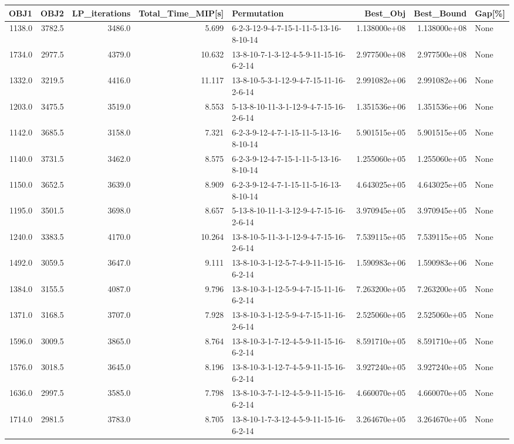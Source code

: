 \begin{tabular}{rrrrlrrl}
\toprule
   OBJ1 &    OBJ2 &  LP\_iterations &  Total\_Time\_MIP[s] &                             Permutation &      Best\_Obj &    Best\_Bound & Gap[\%] \\
\midrule
 1138.0 &  3782.5 &         3486.0 &              5.699 &  6-2-3-12-9-4-7-15-1-11-5-13-16-8-10-14 &  1.138000e+08 &  1.138000e+08 &   None \\
 1734.0 &  2977.5 &         4379.0 &             10.632 &  13-8-10-7-1-3-12-4-5-9-11-15-16-6-2-14 &  2.977500e+08 &  2.977500e+08 &   None \\
 1332.0 &  3219.5 &         4416.0 &             11.117 &  13-8-10-5-3-1-12-9-4-7-15-11-16-2-6-14 &  2.991082e+06 &  2.991082e+06 &   None \\
 1203.0 &  3475.5 &         3519.0 &              8.553 &  5-13-8-10-11-3-1-12-9-4-7-15-16-2-6-14 &  1.351536e+06 &  1.351536e+06 &   None \\
 1142.0 &  3685.5 &         3158.0 &              7.321 &  6-2-3-9-12-4-7-1-15-11-5-13-16-8-10-14 &  5.901515e+05 &  5.901515e+05 &   None \\
 1140.0 &  3731.5 &         3462.0 &              8.575 &  6-2-3-9-12-4-7-15-1-11-5-13-16-8-10-14 &  1.255060e+05 &  1.255060e+05 &   None \\
 1150.0 &  3652.5 &         3639.0 &              8.909 &  6-2-3-9-12-4-7-1-15-11-5-16-13-8-10-14 &  4.643025e+05 &  4.643025e+05 &   None \\
 1195.0 &  3501.5 &         3698.0 &              8.657 &  5-13-8-10-11-1-3-12-9-4-7-15-16-2-6-14 &  3.970945e+05 &  3.970945e+05 &   None \\
 1240.0 &  3383.5 &         4170.0 &             10.264 &  13-8-10-5-11-3-1-12-9-4-7-15-16-2-6-14 &  7.539115e+05 &  7.539115e+05 &   None \\
 1492.0 &  3059.5 &         3647.0 &              9.111 &  13-8-10-3-1-12-5-7-4-9-11-15-16-6-2-14 &  1.590983e+06 &  1.590983e+06 &   None \\
 1384.0 &  3155.5 &         4087.0 &              9.796 &  13-8-10-3-1-12-5-9-4-7-15-11-16-6-2-14 &  7.263200e+05 &  7.263200e+05 &   None \\
 1371.0 &  3168.5 &         3707.0 &              7.928 &  13-8-10-3-1-12-5-9-4-7-15-11-16-2-6-14 &  2.525060e+05 &  2.525060e+05 &   None \\
 1596.0 &  3009.5 &         3865.0 &              8.764 &  13-8-10-3-1-7-12-4-5-9-11-15-16-6-2-14 &  8.591710e+05 &  8.591710e+05 &   None \\
 1576.0 &  3018.5 &         3645.0 &              8.196 &  13-8-10-3-1-12-7-4-5-9-11-15-16-6-2-14 &  3.927240e+05 &  3.927240e+05 &   None \\
 1636.0 &  2997.5 &         3585.0 &              7.798 &  13-8-10-3-7-1-12-4-5-9-11-15-16-6-2-14 &  4.660070e+05 &  4.660070e+05 &   None \\
 1714.0 &  2981.5 &         3783.0 &              8.705 &  13-8-10-1-7-3-12-4-5-9-11-15-16-6-2-14 &  3.264670e+05 &  3.264670e+05 &   None \\
\bottomrule
\end{tabular}
